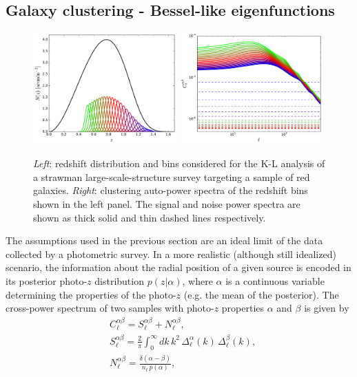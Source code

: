 \documentclass[twocolumn,amsfont,amssymb,amsmath, showpacs,balancelastpage, nofootinbib]{revtex4-1}
\begin{document}
  \subsection{Galaxy clustering - Bessel-like eigenfunctions}\label{ssec:results.gc}
    \begin{figure}
      \centering
      \includegraphics[width=0.49\textwidth]{Figs/nz_lsst_gc}
      \includegraphics[width=0.49\textwidth]{Figs/c_ij_gc}
      \caption{{\sl Left}: redshift distribution and bins considered for the K-L analysis of a strawman large-scale-structure survey targeting a sample of red galaxies. {\sl Right}: clustering auto-power spectra of the redshift bins shown in the left panel. The signal and noise power spectra are shown as thick solid and thin dashed lines respectively.}\label{fig:nz_gc}
    \end{figure}
    The assumptions used in the previous section are an ideal limit of the data collected by a photometric survey. In a more realistic (although still idealized) scenario, the information about the radial position of a given source is encoded in its posterior photo-$z$ distribution $p(z|\alpha)$, where $\alpha$ is a continuous variable determining the properties of the photo-$z$ (e.g. the mean of the posterior). The cross-power spectrum of two samples with photo-$z$ properties $\alpha$ and $\beta$ is given by
    \begin{align}
      &C_\ell^{\alpha\beta}=S^{\alpha\beta}_\ell+N^{\alpha\beta}_\ell,\\\label{eq:cl_generic}
      &S_\ell^{\alpha\beta}=\frac{2}{\pi}\int_0^\infty dk\,k^2\,\Delta_\ell^\alpha(k)\,\Delta_\ell^\beta(k),\\
      &N_\ell^{\alpha\beta}=\frac{\delta(\alpha-\beta)}{n_t\,p(\alpha)},
    \end{align}
\end{document}
